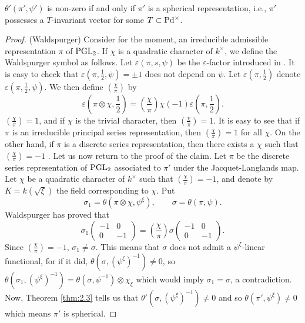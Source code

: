 \begin{claim}
$\theta'(\pi', \psi')$ is non-zero if and only if $\pi'$ is a spherical representation, i.e., $\pi'$ possesses a $T$-invariant vector for some $T \subset \mathrm{P} \mathrm{d}^\times$.
\end{claim}

\begin{proof}(Waldspurger)
Consider for the moment, an irreducible admissible representation $\pi$ of $\mathrm{PGL}_2$.
If $\chi$ is a quadratic character of $k^\times$, we define the Waldspurger symbol as follows.
Let $\varepsilon(\pi, s, \psi)$ be the $\varepsilon$-factor introduced in \cite{jl70gl2}.
It is easy to check that $\varepsilon(\pi, \frac{1}{2}, \psi) = \pm 1$ does not depend on $\psi$.
Let $\varepsilon(\pi, \frac{1}{2})$ denote $\varepsilon(\pi, \frac{1}{2}, \psi)$.
We then define $\left(\frac{\chi}{\pi}\right)$ by
\[
\varepsilon\left(\pi \otimes \chi, \frac{1}{2}\right) = \left( \frac{\chi}{\pi} \right) \chi(-1) \varepsilon\left( \pi, \frac{1}{2}\right).
\]
$\left(\frac{\chi}{\pi}\right) = 1$, and if $\chi$ is the trivial character, then $\left(\frac{\chi}{\pi}\right) = 1$.
It is easy to see that if $\pi$ is an irreducible principal series representation, then $\left(\frac{\chi}{\pi}\right) =1$ for all $\chi$.
On the other hand, if $\pi$ is a discrete series representation, then there exists a $\chi$ such that $\left(\frac{\chi}{\pi}\right) = -1$ \cite{waldspurger91quaternion}.
Let us now return to the proof of the claim.
Let $\pi$ be the discrete series representation of $\mathrm{PGL}_2$ associated to $\pi'$ under the Jacquet-Langlands map.
Let $\chi$ be a quadratic character of $k^\times$ such
that $\left(\frac{\chi}{\pi}\right) = -1$, and denote by $K = k(\sqrt{\xi})$ the field corresponding to $\chi$.
Put
\[
\sigma_1 = \theta(\pi \otimes \chi, \psi^{\xi}),\qquad \sigma = \theta(\pi, \psi).
\]
Waldspurger has proved that 
\[
\sigma_1\begin{pmatrix}
    -1 & 0 \\ 0 & -1
\end{pmatrix} = \left(\frac{\chi}{\pi}\right) \sigma\begin{pmatrix}
    -1 & 0 \\ 0 & -1
\end{pmatrix}.
\]
Since $\left(\frac{\chi}{\pi}\right) = -1$, $\sigma_1 \neq \sigma$.
This means that $\sigma$ does not admit a $\psi^\xi$-linear functional, for if it did, $\theta(\sigma, (\psi^{\xi})^{-1}) \neq 0$, so $\theta(\sigma_1, (\psi^{\xi})^{-1}) = \theta(\sigma, \psi^{-1}) \otimes \chi_\xi$ which would imply $\sigma_1 = \sigma$, a contradiction.
Now, Theorem \ref{thm:2.3} tells us that $\theta'(\sigma, (\psi^{\xi})^{-1}) \neq 0$ and so $\theta(\pi', \psi^{\xi}) \neq 0$ which means $\pi'$ is spherical.
\end{proof}

